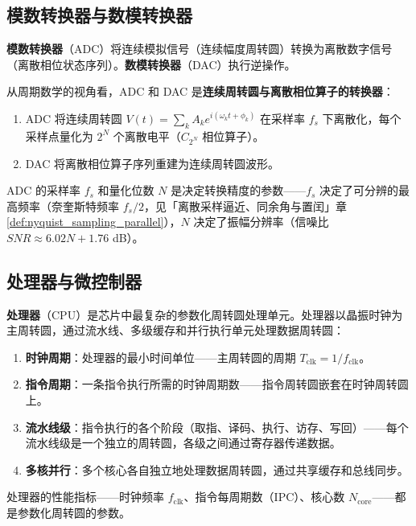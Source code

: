 \subsection{模数转换器与数模转换器}

\begin{definition}\label{def:adc_dac}
\textbf{模数转换器}（ADC）将连续模拟信号（连续幅度周转圆）转换为离散数字信号（离散相位状态序列）。\textbf{数模转换器}（DAC）执行逆操作。

从周期数学的视角看，ADC 和 DAC 是\textbf{连续周转圆与离散相位算子的转换器}：
\begin{enumerate}[label=(\roman*)]
    \item ADC 将连续周转圆 $V(t) = \sum_k A_k e^{i(\omega_k t + \phi_k)}$ 在采样率 $f_s$ 下离散化，每个采样点量化为 $2^N$ 个离散电平（$C_{2^N}$ 相位算子）。
    \item DAC 将离散相位算子序列重建为连续周转圆波形。
\end{enumerate}
ADC 的采样率 $f_s$ 和量化位数 $N$ 是决定转换精度的参数——$f_s$ 决定了可分辨的最高频率（奈奎斯特频率 $f_s/2$，见「离散采样逼近、同余角与置闰」章 \cref{def:nyquist_sampling_parallel}），$N$ 决定了振幅分辨率（信噪比 $SNR \approx 6.02N + 1.76$ dB）。
\end{definition}

\subsection{处理器与微控制器}

\begin{definition}[处理器的周转圆解释]\label{def:cpu_epicycle}
\textbf{处理器}（CPU）是芯片中最复杂的参数化周转圆处理单元。处理器以晶振时钟为主周转圆，通过流水线、多级缓存和并行执行单元处理数据周转圆：
\begin{enumerate}[label=(\roman*)]
    \item \textbf{时钟周期}：处理器的最小时间单位——主周转圆的周期 $T_{\text{clk}} = 1/f_{\text{clk}}$。
    \item \textbf{指令周期}：一条指令执行所需的时钟周期数——指令周转圆嵌套在时钟周转圆上。
    \item \textbf{流水线级}：指令执行的各个阶段（取指、译码、执行、访存、写回）——每个流水线级是一个独立的周转圆，各级之间通过寄存器传递数据。
    \item \textbf{多核并行}：多个核心各自独立地处理数据周转圆，通过共享缓存和总线同步。
\end{enumerate}
处理器的性能指标——时钟频率 $f_{\text{clk}}$、指令每周期数（IPC）、核心数 $N_{\text{core}}$——都是参数化周转圆的参数。
\end{definition}

